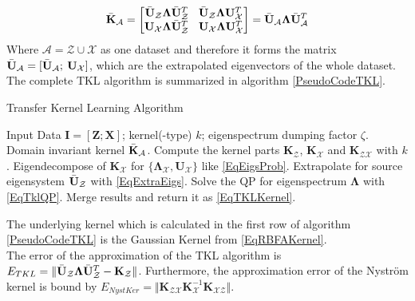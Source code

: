 \begin{equation}\label{EqTKLKernel}
	\bar{\mathbf{K}}_\mathcal{A} = 
	\begin{bmatrix}
	 \bar{\mathbf{U}}_\mathcal{Z} \boldsymbol{\Lambda} \bar{\mathbf{U}}_\mathcal{Z}^T \>\>\>\> \bar{\mathbf{U}}_\mathcal{Z} \boldsymbol{\Lambda} \mathbf{U}_\mathcal{X}^T \\
	 \mathbf{U}_\mathcal{X} \boldsymbol{\Lambda} \bar{\mathbf{U}}_\mathcal{Z}^T \>\>\>\> \mathbf{U}_\mathcal{X} \boldsymbol{\Lambda} \mathbf{U}_\mathcal{X}^T 
	\end{bmatrix}
	= 	 \bar{\mathbf{U}}_\mathcal{A} \boldsymbol{\Lambda} \bar{\mathbf{U}}_\mathcal{A}^T 
\end{equation}
Where $\mathcal{A}= \mathcal{Z} \cup \mathcal{X}$ as one dataset and therefore it forms the matrix $ \bar{\mathbf{U}}_\mathcal{A} =[ \bar{\mathbf{U}}_\mathcal{A};\>  \mathbf{U}_\mathcal{X}]$, which are the extrapolated eigenvectors of the whole dataset.\newline
The complete \acs{TKL} algorithm is summarized in algorithm \ref{PseudoCodeTKL}.\cite{Long.2015}
\begin{algorithm}
	\caption{Transfer Kernel Learning Algorithm}\label{PseudoCodeTKL}	
	\begin{algorithmic}[1]
		\Require Input Data $\mathbf{I} = [\mathbf{Z};\mathbf{X}]$; kernel(-type) $k$; eigenspectrum dumping factor $\zeta$.
		\Ensure Domain invariant kernel $\bar{\mathbf{K}}_\mathcal{A}$.
		\State Compute the kernel parts $\mathbf{K}_\mathcal{Z}$, $\mathbf{K}_\mathcal{X}$ and $\mathbf{K}_\mathcal{ZX}$ with $k$.
		\State Eigendecompose of $\mathbf{K}_\mathcal{X}$ for $\{\mathbf{\Lambda}_\mathcal{X}, \mathbf{U}_\mathcal{X}\}$ like \eqref{EqEigsProb}.
		\State Extrapolate for source eigensystem  $\bar{\mathbf{U}}_\mathcal{Z}$ with \eqref{EqExtraEigs}.
		\State Solve the \acs{QP} for eigenspectrum $\mathbf{\Lambda}$ with \eqref{EqTklQP}.
		\State Merge results and return it as \eqref{EqTKLKernel}.
	\end{algorithmic}
\end{algorithm}
The underlying kernel which is calculated in the first row of algorithm \ref{PseudoCodeTKL} is the Gaussian Kernel from \eqref{EqRBFAKernel}.\\
The error of the approximation of the \acl{TKL} algorithm is $E_{TKL} = \Vert \bar{\mathbf{U}}_\mathcal{Z} \boldsymbol{\Lambda}\bar{\mathbf{U}}_\mathcal{Z}^T - \mathbf{K}_\mathcal{Z}\Vert$.
Furthermore, the approximation error of the Nyström kernel is bound by $E_{NystKer} = \Vert \mathbf{K}_{\mathcal{ZX}} \mathbf{K}_{\mathcal{X}}^{-1}\mathbf{K}_{\mathcal{XZ}}\Vert$.
